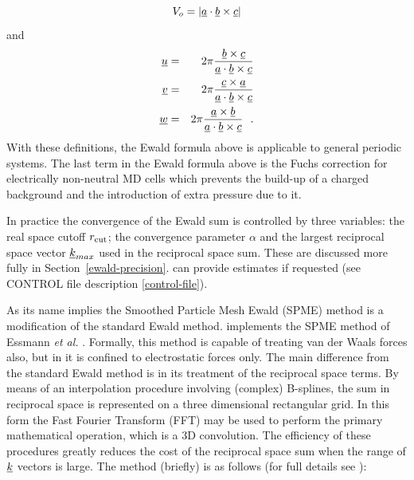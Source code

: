 \begin{equation}
V_{o} = |\mbox{$\underline{a}$} \cdot \mbox{$\underline{b}$} \times \mbox{$\underline{c}$}|
\end{equation}
and
\begin{eqnarray}
\mbox{$\underline{u}$} &=& 2 \pi \frac{\mbox{$\underline{b}$} \times \mbox{$\underline{c}$}}{\mbox{$\underline{a}$} \cdot \mbox{$\underline{b}$} \times \mbox{$\underline{c}$}} \nonumber \\
\mbox{$\underline{v}$} &=& 2 \pi \frac{\mbox{$\underline{c}$} \times \mbox{$\underline{a}$}}{\mbox{$\underline{a}$} \cdot \mbox{$\underline{b}$} \times\mbox{$\underline{c}$}} \\
\mbox{$\underline{w}$} &=& 2 \pi \frac{\mbox{$\underline{a}$} \times \mbox{$\underline{b}$}}{\mbox{$\underline{a}$} \cdot \mbox{$\underline{b}$} \times \mbox{$\underline{c}$}}~~. \nonumber
\end{eqnarray}
With these definitions, the Ewald formula above is applicable to
general periodic systems.  The last term in the Ewald formula above
is the Fuchs correction \cite{fuchs-35a} for electrically
non-neutral MD cells which prevents the build-up of a charged
background and the introduction of extra pressure due to it.

In practice the convergence of the Ewald sum is controlled by
three variables: the real space cutoff $r_{\rm cut}$; the convergence
parameter $\alpha$ and the largest reciprocal space vector
$\mbox{$\underline{k}$}_{max}$ used in the reciprocal space sum.  These are
discussed more fully in Section~\ref{ewald-precision}.  \D can
provide estimates if requested (see CONTROL file description
\ref{control-file}).

As its name implies the Smoothed Particle Mesh Ewald (SPME)
 method is a modification of the standard Ewald
method.  \D implements the SPME method of Essmann {\em et al.}
\cite{essmann-95a}.  Formally, this method is capable of treating
van der Waals forces also, but in \D it is confined to
electrostatic forces only.  The main difference from the standard
Ewald method is in its treatment of the reciprocal space
terms.  By means of an interpolation procedure involving (complex)
B-splines, the sum in reciprocal space is represented on a three
dimensional rectangular grid.  In this form the Fast Fourier
Transform (FFT) may be used to perform the primary mathematical
operation, which is a 3D convolution.  The efficiency of these
procedures greatly reduces the cost of the reciprocal space sum
when the range of $\mbox{$\underline{k}$}$ vectors is large.  The method
(briefly) is as follows (for full details see \cite{essmann-95a}):

